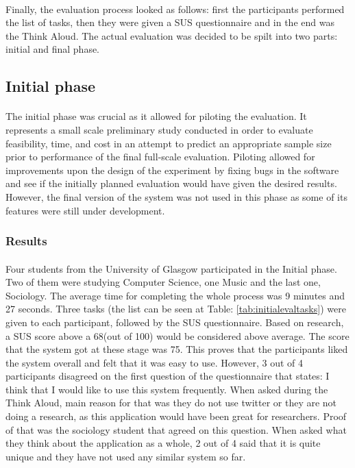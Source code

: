 \documentclass{l4proj}
\begin{document}
\paragraph{} 
 Finally, the evaluation process looked as follows: first the participants performed the list of tasks, then they were given a SUS questionnaire and in the end was the Think Aloud. The actual evaluation was decided to be spilt into two parts: initial and final phase.
\subsection{Initial phase}
\paragraph{}
The initial phase was crucial as it allowed for piloting the evaluation. It represents a small scale preliminary study conducted in order to evaluate feasibility, time, and cost in an attempt to predict an appropriate sample size prior to performance of the final full-scale evaluation\cite{clinicalresearch}. Piloting allowed for improvements upon the design of the experiment by fixing bugs in the software and see if the initially planned evaluation would have given the desired results. However, the final version of the system was not used in this phase as some of its features were still under development. 
\subsubsection{Results}
\paragraph{}
Four students from the University of Glasgow participated in the Initial phase. Two of them were studying Computer Science, one Music and the last one, Sociology. The average time for completing the whole process was 9 minutes and 27 seconds. Three tasks (the list can be seen at Table: \ref{tab:initialevaltasks}) were given to each participant, followed by the SUS questionnaire. Based on research, a SUS score above a 68(out of 100) would be considered above average. The score that the system got at these stage was 75. This proves that the participants liked the system overall and felt that it was easy to use. However, 3 out of 4 participants disagreed on the first question of the questionnaire that states: I think that I would like to use this system frequently. When asked during the Think Aloud, main reason for that was they do not use twitter or they are not doing a research, as this application would have been great for researchers. Proof of that was the sociology student that agreed on this question. When asked what they think about the application as a whole, 2 out of 4 said that it is quite unique and they have not used any similar system so far.
\end{document}
